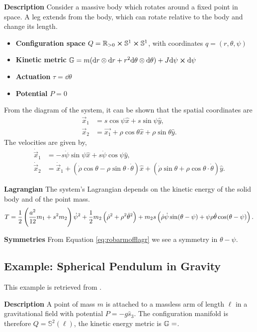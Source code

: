 \documentclass[main.tex]{subfiles}
\begin{document}
\textbf{Description} Consider a massive body which rotates around a fixed point in space. A leg extends from the body, which can rotate relative to the body and change its length.

\begin{itemize}
    \item \textbf{Configuration space} $Q=\mathbb{R}_{>0}\cross\mathbb{S}^1\cross\mathbb{S}^1$, with coordinates $q=(r,\theta,\psi)$
    \item \textbf{Kinetic metric} $\mathbb{G}=m(\dd r\otimes\dd r + r^2\dd\theta\otimes\dd\theta)+J\dd\psi\cross\dd\psi$
    \item \textbf{Actuation} $\tau=\dd \theta$
    \item \textbf{Potential} $P=0$
\end{itemize}
From the diagram of the system, it can be shown that the spatial coordinates are
\begin{align}
    \Vec{x}_1&=s\cos\psi\hat{x}+s\sin\psi\hat{y},\\
    \Vec{x}_2&=\Vec{x_1}+\rho\cos\theta\hat{x}+\rho\sin\theta\hat{y}.
\end{align}
The velocities are given by,
\begin{align}
    \dot\Vec{x}_1&=-s\dot\psi\sin\psi\hat{x}+s\dot\psi\cos\psi\hat{y},\\
    \dot\Vec{x}_2&=\dot\Vec{x}_1+(\dot\rho\cos\theta-\rho\sin\theta\cdot\dot\theta)\hat{x}+(\dot\rho\sin\theta+\rho\cos\theta\cdot\dot\theta)\hat{y}.
\end{align}

\textbf{Lagrangian}
The system's Lagrangian depends on the kinetic energy of the solid body and of the point mass.
\begin{align}
    T=\frac{1}{2}\del{\frac{a^2}{12}m_1+s^2m_2}\dot{\psi}^2+\frac{1}{2}m_2\del{\dot\rho^2+\rho^2\dot\theta^2}+m_2s\del{\dot\rho\dot\psi\sin(\theta-\psi)+\psi\rho\dot\theta\cos(\theta-\psi)}.\label{eq:robarmofflagr}
\end{align}

\textbf{Symmetries} From Equation \ref{eq:robarmofflagr} we see a symmetry in $\theta-\psi$.


\subsection{Example: Spherical Pendulum in Gravity}
This example is retrieved from \cite[295]{bullo2019geometric}.%

\textbf{Description} A point of mass $m$ is attached to a massless arm of length $\ell$ in a gravitational field with potential $P=-g\hat{s}_3$. The configuration manifold is therefore $Q=\mathbb{S}^2(\ell)$, the kinetic energy metric is $\mathbb{G}=$.
\end{document}
